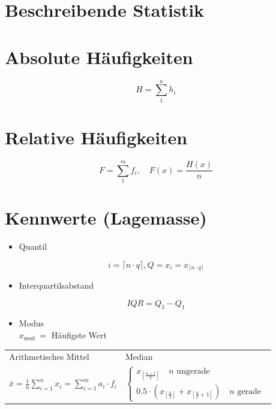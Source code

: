 \documentclass[10pt]{article}
\begin{document}
\section*{Beschreibende Statistik}
\section*{Absolute Häufigkeiten}
$$
H=\sum_{1}^{n} h_{i}
$$

\section*{Relative Häufigkeiten}
$$
F=\sum_{1}^{m} f_{i}, \quad F(x)=\frac{H(x)}{n}
$$

\section*{Kennwerte (Lagemasse)}
\begin{itemize}
  \item Quantil
\end{itemize}

$$
i=\lceil n \cdot q\rceil, Q=x_{i}=x_{\lceil n \cdot q\rceil}
$$

\begin{itemize}
  \item Interquartilsabstand
\end{itemize}

$$
I Q R=Q_{3}-Q_{1}
$$

\begin{itemize}
  \item Modus\\
$x_{\text {mod }}=$ Häufigste Wert
\end{itemize}

\begin{center}
\begin{tabular}{|l|l|}
\hline
Arithmetisches Mittel & Median \\
$\bar{x}=\frac{1}{n} \sum_{i=1}^{n} x_{i}=\sum_{i=1}^{m} a_{i} \cdot f_{i}$ & $\left\{\begin{array}{c}x_{\left[\frac{n+1}{2}\right]} \quad n \text { ungerade } \\ 0.5 \cdot\left(x_{\left[\frac{n}{2}\right]}+x_{\left[\frac{n}{2}+1\right]}\right) \quad n \text { gerade }\end{array}\right.$ \\
\end{tabular}
\end{center}
\end{document}
